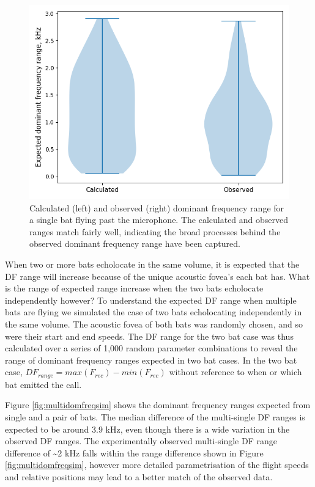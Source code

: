 \documentclass[
]{book}
\begin{document}
\begin{figure}
\includegraphics[width=1\linewidth]{original_papers/hbc-paper/combined_analysis/domfreq_range_single} \caption{\label{fig:singledomfreqrangesim} Calculated (left) and observed (right) dominant frequency range for a single bat flying past the microphone. The calculated and observed ranges match fairly well, indicating the broad processes behind the observed  dominant frequency range have been captured.}\label{fig:singledomfreqrangesim}
\end{figure}

When two or more bats echolocate in the same volume, it is expected that the DF range will increase because of the unique acoustic fovea's each bat has. What is the range of expected range increase when the two bats echolocate independently however? To understand the expected DF range when multiple bats are flying we simulated the case of two bats echolocating independently in the same volume. The acoustic fovea of both bats was randomly chosen, and so were their start and end speeds. The DF range for the two bat case was thus calculated over a series of 1,000 random parameter combinations to reveal the range of dominant frequency ranges expected in two bat cases. In the two bat case, \(DF_{range}=max(F_{rec})-min(F_{rec})\) without reference to when or which bat emitted the call.

Figure \ref{fig:multidomfreqsim} shows the dominant frequency ranges expected from single and a pair of bats. The median difference of the multi-single DF ranges is expected to be around 3.9 kHz, even though there is a wide variation in the observed DF ranges. The experimentally observed multi-single DF range difference of \textasciitilde2 kHz falls within the range difference shown in Figure \ref{fig:multidomfreqsim}, however more detailed parametrisation of the flight speeds and relative positions may lead to a better match of the observed data.
\end{document}
